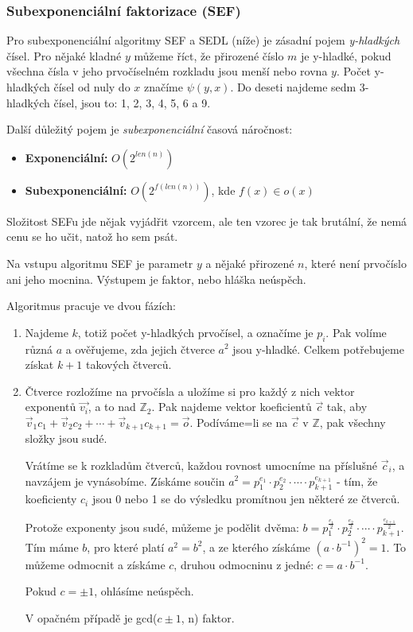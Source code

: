 \documentclass[10pt,a4paper]{article}
\begin{document}
\subsubsection{Subexponenciální faktorizace (SEF)}
Pro subexponenciální algoritmy SEF a SEDL (níže) je zásadní pojem \textit{y-hladkých} čísel. Pro nějaké kladné $y$ můžeme říct, že přirozené číslo $m$ je y-hladké, pokud všechna čísla v jeho prvočíselném rozkladu jsou menší nebo rovna $y$. Počet y-hladkých čísel od nuly do $x$ značíme $\psi(y, x)$. Do deseti najdeme sedm 3-hladkých čísel, jsou to: 1, 2, 3, 4, 5, 6 a 9.

Další důležitý pojem je \textit{subexponenciální} časová náročnost:
\begin{itemize}
\item \textbf{Exponenciální:} $O(2^{len(n)})$
\item \textbf{Subexponenciální:} $O(2^{f(len(n))})$, kde $f(x)\in o(x)$
\end{itemize}

Složitost SEFu jde nějak vyjádřit vzorcem, ale ten vzorec je tak brutální, že nemá cenu se ho učit, natož ho sem psát.

Na vstupu algoritmu SEF je parametr $y$ a nějaké přirozené $n$, které není prvočíslo ani jeho mocnina. Výstupem je faktor, nebo hláška neúspěch. 

Algoritmus pracuje ve dvou fázích:

\begin{enumerate}
\item Najdeme $k$, totiž počet y-hladkých prvočísel, a označíme je $p_i$. Pak volíme různá $a$ a ověřujeme, zda jejich čtverce $a^2$ jsou y-hladké. Celkem potřebujeme získat $k+1$ takových čtverců.
\item Čtverce rozložíme na prvočísla a uložíme si pro každý z nich vektor exponentů $\vec{v_i}$, a to nad $\mathbb{Z}_2$. Pak najdeme vektor koeficientů $\vec{c}$ tak, aby $\vec{v}_1c_1 + \vec{v}_2c_2  + \cdots + \vec{v}_{k+1}c_{k+1} = \vec{o}$. Podíváme=li se na $\vec{c}$ v  $\mathbb{Z}$, pak všechny složky jsou sudé. 

Vrátíme se k rozkladům čtverců, každou rovnost umocníme na příslušné $\vec{c}_i$, a navzájem je vynásobíme. Získáme součin $a^2 = p_1^{e_1} \cdot p_2^{e_2} \cdot \cdots \cdot p_{k+1}^{e_{k+1}}$ - tím, že koeficienty $c_i$ jsou 0 nebo 1 se do výsledku promítnou jen některé ze čtverců.

Protože exponenty jsou sudé, můžeme je podělit dvěma: $b = p_1^{\frac{e_1}{2}} \cdot p_2^{\frac{e_2}{2}} \cdot \cdots \cdot p_{k+1}^{\frac{e_{k+1}}{2}}$. Tím máme $b$, pro které platí $a^2 = b^2$, a ze kterého získáme $(a\cdot b^{-1})^2 = 1$. To můžeme odmocnit a získáme $c$, druhou odmocninu z jedné: $c = a\cdot b^{-1}$.

Pokud $c = \pm 1$, ohlásíme neúspěch.

V opačném případě je gcd($c \pm 1$, n) faktor.
\end{enumerate}
\end{document}
